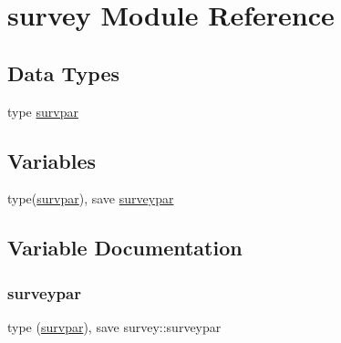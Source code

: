 \hypertarget{namespacesurvey}{}\section{survey Module Reference}
\label{namespacesurvey}
\subsection*{Data Types}
\begin{DoxyCompactItemize}
\item 
type \mbox{\hyperlink{structsurvey_1_1survpar}{survpar}}
\end{DoxyCompactItemize}
\subsection*{Variables}
\begin{DoxyCompactItemize}
\item 
type(\mbox{\hyperlink{structsurvey_1_1survpar}{survpar}}), save \mbox{\hyperlink{namespacesurvey_a4fc1eec30a42a46b8a0ea67ca671fc83}{surveypar}}
\end{DoxyCompactItemize}


\subsection{Variable Documentation}
\mbox{\label{namespacesurvey_a4fc1eec30a42a46b8a0ea67ca671fc83}} 
\subsubsection{\texorpdfstring{surveypar}{surveypar}}
{\footnotesize\ttfamily type (\mbox{\hyperlink{structsurvey_1_1survpar}{survpar}}), save survey\+::surveypar}

